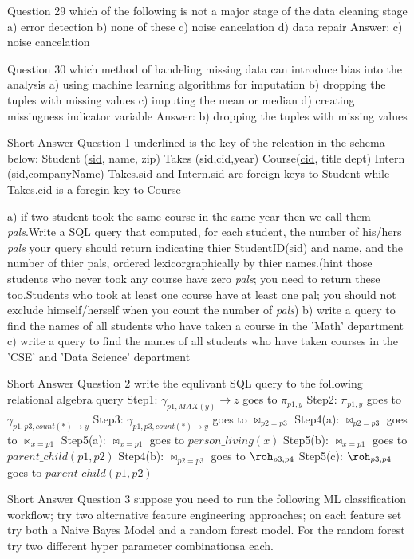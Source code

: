 Question 29
which of the following is not a major stage of the data cleaning stage
a) error detection
b) none of these
c) noise cancelation
d) data repair
Answer: c) noise cancelation

Question 30
which method of handeling missing data can introduce bias into the analysis
a) using machine learning algorithms for imputation
b) dropping the tuples with missing values
c) imputing the mean or median
d) creating missingness indicator variable
Answer: b) dropping the tuples with missing values

Short Answer Question 1
underlined is the key of the releation in the schema below:
Student (\underline{sid}, name, zip)
Takes (sid,cid,year)
Course(\underline{cid}, title dept)
Intern (sid,companyName)
Takes.sid and Intern.sid are foreign keys to Student while Takes.cid is a foregin key to Course

a) if two student took the same course in the same year then  we call them \textit{pals}.Write a SQL query that computed, for each student, the number of his/hers \textit{pals} your query should return indicating thier StudentID(sid) and name, and the number of thier pals, ordered lexicorgraphically by thier names.(hint those students who never took any course have zero \textit{pals}; you need to return these too.Students who took at least one course have at least one pal; you should not exclude himself/herself when you count the number of \textit{pals})
b) write a query to find the names of all students who have taken a course in the 'Math' department
c) write a query to find the names of all students who have taken courses in the 'CSE' and 'Data Science' department

Short Answer Question 2
write the equlivant SQL query to the following relational algebra query
Step1: $\gamma_{p1,MAX(y)}\rightarrow z$ goes to $\pi_{p1,y}$ 
Step2: $\pi_{p1,y}$ goes to $\gamma_{p1,p3,count(*)\rightarrow y}$
Step3: $\gamma_{p1,p3,count(*)\rightarrow y}$ goes to $\bowtie_{p2=p3}$
Step4(a): $\bowtie_{p2=p3}$ goes to $\bowtie_{x=p1}$
Step5(a): $\bowtie_{x=p1}$ goes to $person\_living(x)$
Step5(b): $\bowtie_{x=p1}$ goes to $parent\_child(p1,p2)$
Step4(b): $\bowtie_{p2=p3}$ goes to $\roh_{p3,p4}$
Step5(c): $\roh_{p3,p4}$ goes to $parent\_child(p1,p2)$


Short Answer Question 3
suppose you need to run the following ML classification workflow; try two alternative feature engineering approaches; on each feature set try both a Naive Bayes Model and a random forest model. For the random forest try two different hyper parameter combinationsa each.

